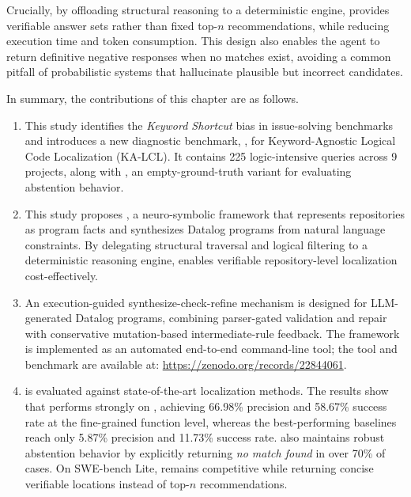 Crucially, by offloading structural reasoning to a deterministic engine, \tooldataloc provides verifiable answer sets rather than fixed top-$n$ recommendations, while reducing execution time and token consumption. This design also enables the agent to return definitive negative responses when no matches exist, avoiding a common pitfall of probabilistic systems that hallucinate plausible but incorrect candidates.

In summary, the contributions of this chapter are as follows.

\begin{enumerate}
    \item This study identifies the \textit{Keyword Shortcut} bias in issue-solving benchmarks and introduces a new diagnostic benchmark, \dataset, for Keyword-Agnostic Logical Code Localization (KA-LCL). It contains 225 logic-intensive queries across 9 projects, along with \negset, an empty-ground-truth variant for evaluating abstention behavior.
    \item This study proposes \tooldataloc, a neuro-symbolic framework that represents repositories as program facts and synthesizes Datalog programs from natural language constraints. By delegating structural traversal and logical filtering to a deterministic reasoning engine, \tooldataloc enables verifiable repository-level localization cost-effectively.
    \item An execution-guided synthesize-check-refine mechanism is designed for LLM-generated Datalog programs, combining parser-gated validation and repair with conservative mutation-based intermediate-rule feedback. The framework is implemented as an automated end-to-end command-line tool; the tool and benchmark are available at: \url{https://zenodo.org/records/22844061}.
    \item \tooldataloc is evaluated against state-of-the-art localization methods. The results show that \tooldataloc performs strongly on \dataset, achieving 66.98\% precision and 58.67\% success rate at the fine-grained function level, whereas the best-performing baselines reach only 5.87\% precision and 11.73\% success rate. \tooldataloc also maintains robust abstention behavior by explicitly returning \textit{no match found} in over 70\% of \negset cases. On SWE-bench Lite, \tooldataloc remains competitive while returning concise verifiable locations instead of top-$n$ recommendations.
\end{enumerate}
